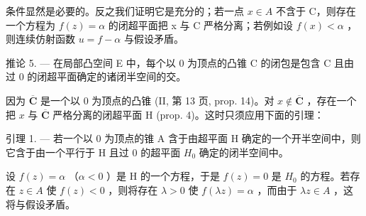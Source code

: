 条件显然是必要的。反之我们证明它是充分的；若一点 \(x \in A\) 不含于 C，则存在一个方程为 \(f(z) = \alpha\) 的闭超平面把 x 与 C 严格分离；若例如设 \(f(x) < \alpha\) ，则连续仿射函数 \(u = f - \alpha\) 与假设矛盾。

推论 5. --- 在局部凸空间 E 中，每个以 0 为顶点的凸锥 C 的闭包是包含 C 且由过 0 的闭超平面确定的诸闭半空间的交。

因为 \(\overline{\mathbf{C}}\) 是一个以 0 为顶点的凸锥 (II, 第 13 页, prop. 14)。对 \(x \notin \overline{\mathbf{C}}\) ，存在一个把 \(x\) 与 \(\overline{\mathbf{C}}\) 严格分离的闭超平面 H (prop. 4)。这时只须应用下面的引理：

引理 1. --- 若一个以 0 为顶点的锥 A 含于由超平面 H 确定的一个开半空间中，则它含于由一个平行于 H 且过 0 的超平面 \(H_{0}\) 确定的闭半空间中。

设 \(f(z) = \alpha\) （\(\alpha < 0\) ）是 H 的一个方程，于是 \(f(z) = 0\) 是 \(H_0\) 的方程。若存在 \(z \in A\) 使 \(f(z) < 0\) ，则将存在 \(\lambda > 0\) 使 \(f(\lambda z) = \alpha\) ，而由于 \(\lambda z \in A\) ，这将与假设矛盾。

